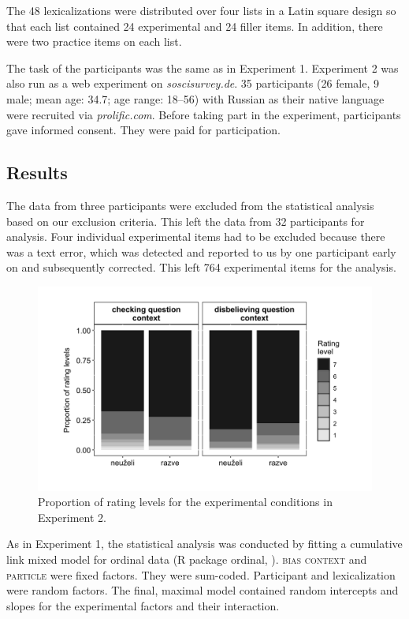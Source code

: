 \documentclass[output=paper,colorlinks,citecolor=brown]{langscibook}
\begin{document}
The 48 lexicalizations were distributed over four lists in a Latin square design so that each list contained 24 experimental and 24 filler items. In addition, there were two practice items on each list. 

The task of the participants was the same as in Experiment 1. Experiment 2 was also run as a web experiment on \textit{soscisurvey.de}. 35 participants (26 female, 9 male; mean age: 34.7; age range: 18--56) with Russian as their native language were recruited via \textit{prolific.com}. Before taking part in the experiment, participants gave informed consent. They were paid for participation.

\subsection{Results}\label{sec:05:5:2}

The data from three participants were excluded from the statistical analysis based on our exclusion criteria. This left the data from 32 participants for analysis. Four individual experimental items had to be excluded because there was a text error, which was detected and reported to us by one participant early on and subsequently corrected. This left 764 experimental items for the analysis.

\begin{figure} 
\includegraphics[height=.3\textheight]{figures/ch11-3.png}
\caption{Proportion of rating levels for the experimental conditions in Experiment 2.} \label{fig:3}
\end{figure}

As in Experiment 1, the statistical analysis was conducted by fitting a cumulative link mixed model for ordinal data (R package ordinal, \citealt{christ19}). \textsc{bias context} and \textsc{particle} were fixed factors. They were sum-coded. Participant and lexicalization were random factors. The final, maximal model contained random intercepts and slopes for the experimental factors and their interaction.  
\end{document}

